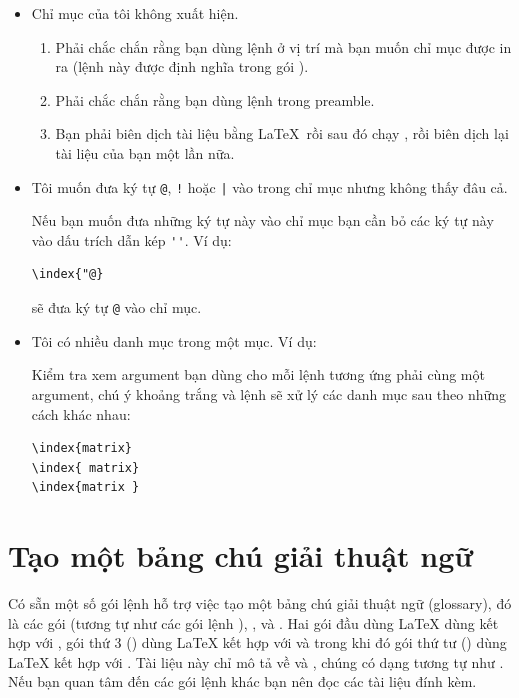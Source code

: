 \documentclass[a4paper]{report}
\begin{document}
\begin{itemize}

\item Chỉ mục của tôi không xuất hiện.

\begin{enumerate}
\item Phải chắc chắn rằng bạn dùng lệnh   ở vị trí mà bạn muốn chỉ mục được in ra (lệnh này được định nghĩa trong gói ).
\item Phải chắc chắn rằng bạn dùng lệnh  trong preamble.
\item Bạn phải biên dịch tài liệu bằng \LaTeX\, rồi sau đó chạy , rồi biên dịch lại tài liệu của bạn một lần nữa.
\end{enumerate}

\item Tôi muốn đưa ký tự \verb|@|, \verb"!" hoặc \verb+|+  vào trong chỉ mục nhưng không thấy đâu cả.

Nếu bạn muốn đưa những ký tự này vào chỉ mục bạn cần  bỏ các ký tự này vào dấu trích dẫn kép \verb|''|. Ví dụ:

\begin{verbatim}
\index{"@}
\end{verbatim}
sẽ đưa ký tự \verb|@| vào chỉ mục.

\item Tôi có nhiều danh mục trong một mục. Ví dụ:

Kiểm tra xem  argument bạn dùng cho mỗi lệnh  tương ứng phải cùng một argument, chú ý khoảng trắng và lệnh  sẽ xử lý các danh mục sau theo những cách khác nhau:

\begin{verbatim}
\index{matrix}
\index{ matrix}
\index{matrix }
\end{verbatim}

\end{itemize}

\section{Tạo một bảng chú giải thuật ngữ}

Có sẵn một số gói lệnh hỗ trợ việc tạo một bảng chú giải thuật ngữ (glossary), đó là các gói  (tương tự như các gói lệnh ), ,  và . Hai gói đầu dùng \LaTeX{} dùng kết hợp với , gói thứ 3   () dùng \LaTeX{} kết hợp với  và  trong khi đó gói thứ tư () dùng \LaTeX{} kết hợp với \BiBTeX{}. Tài liệu này chỉ mô tả về  và , chúng có dạng tương tự như . Nếu bạn quan tâm đến các gói lệnh khác bạn nên đọc các tài liệu đính kèm.
  
\end{document}

